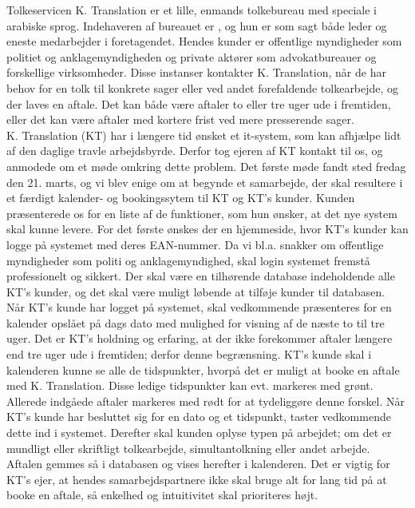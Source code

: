 \documentclass[12pt]{article}   %
\begin{document}
Tolkeservicen K. Translation er et lille, enmands tolkebureau med speciale i arabiske 
sprog. Indehaveren af bureauet er , og hun er som sagt både leder og eneste
medarbejder i foretagendet. Hendes kunder er offentlige myndigheder som
politiet og anklagemyndigheden og private aktører som advokatbureauer og
forskellige virksomheder. Disse instanser kontakter K. Translation, når de har
behov for en tolk til konkrete sager eller ved andet forefaldende
tolkearbejde, og der laves en aftale. Det kan både være aftaler to eller tre uger 
ude i fremtiden, eller det kan være aftaler med kortere frist ved mere presserende 
sager.\\
K. Translation (KT) har i længere tid ønsket et it-system, som kan
afhjælpe lidt af den daglige travle arbejdsbyrde. Derfor tog ejeren af KT
kontakt til os, og anmodede om et møde omkring dette problem. Det første møde fandt 
sted fredag den 21. marts, og vi blev enige om at begynde et samarbejde, der
skal resultere i et færdigt kalender- og bookingssytem til KT og KT's kunder.
Kunden præsenterede os for en liste af de funktioner, som hun ønsker, at det nye system
skal kunne levere. For det første ønskes der en hjemmeside, hvor KT's kunder
kan logge på systemet med deres EAN-nummer. Da vi bl.a. snakker om offentlige
myndigheder som politi og anklagemyndighed, skal login systemet fremstå
professionelt og sikkert. Der skal være en tilhørende database indeholdende
alle KT's kunder, og det skal være muligt løbende at tilføje kunder til
databasen. \\
Når KT's kunde har logget på systemet, skal vedkommende præsenteres for en
kalender opslået på dags dato med mulighed for visning af de næste to til tre
uger. Det er KT's holdning og erfaring, at der ikke forekommer aftaler længere
end tre uger ude i fremtiden; derfor denne begrænsning. KT's kunde skal i
kalenderen kunne se alle de tidspunkter, hvorpå det er muligt at booke en
aftale med K. Translation. Disse ledige tidspunkter kan evt. markeres med
grønt. Allerede indgåede aftaler markeres med rødt for at tydeliggøre
denne forskel. Når KT's kunde har besluttet sig for en dato og et tidspunkt,
taster vedkommende dette ind i systemet. Derefter skal kunden oplyse typen på
arbejdet; om det er mundligt eller skriftligt tolkearbejde, simultantolkning
eller andet arbejde. Aftalen gemmes så i databasen og
vises herefter i kalenderen. Det er vigtig for KT's ejer, at hendes
samarbejdspartnere ikke skal bruge alt for lang tid på at booke en aftale, så
enkelhed og intuitivitet skal prioriteres højt.\\
\end{document}
